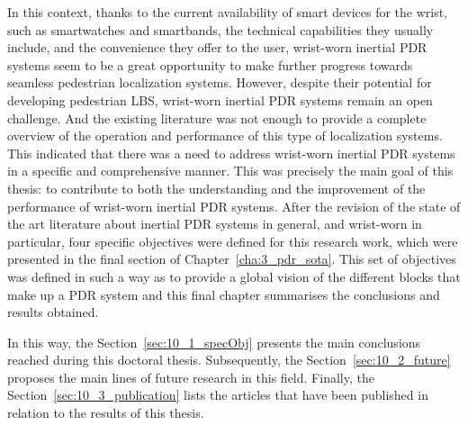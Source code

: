 In this context, thanks to the current availability of smart devices for the wrist, such as smartwatches and smartbands, the technical capabilities they usually include, and the convenience they offer to the user, wrist-worn inertial PDR systems seem to be a great opportunity to make further progress towards seamless pedestrian localization systems.
However, despite their potential for developing pedestrian LBS, wrist-worn inertial PDR systems remain an open challenge.
And the existing literature was not enough to provide a complete overview of the operation and performance of this type of localization systems.
This indicated that there was a need to address wrist-worn inertial PDR systems in a specific and comprehensive manner. 
This was precisely the main goal of this thesis: 
to contribute to both the understanding and the improvement of the performance of wrist-worn inertial PDR systems.
After the revision of the state of the art literature about inertial PDR systems in general, and wrist-worn in particular, four specific objectives were defined for this research work, which were presented in the final section of Chapter~\ref{cha:3_pdr_sota}.
This set of objectives was defined in such a way as to provide a global vision of the different blocks that make up a PDR system and this final chapter summarises the conclusions and results obtained.

In this way, the Section~\ref{sec:10_1_specObj} presents the main conclusions reached during this doctoral thesis.
Subsequently, the Section~\ref{sec:10_2_future} proposes the main lines of future research in this field.
Finally, the Section~\ref{sec:10_3_publication} lists the articles that have been published in relation to the results of this thesis. 

